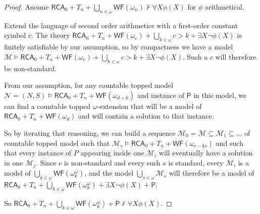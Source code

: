 \documentclass{article}
\numberwithin{theorem}{section}
\newcommand{\RCA}{\mathsf{RCA}}
\newcommand{\WF}{\mathsf{WF}}
\newcommand{\M}{\mathcal{M}}
\begin{document}
\begin{proof}
Assume $\RCA_0 + T_n + \bigcup_{n \in \omega} \WF(\omega_n) \not \vdash \forall X \phi(X)$ for $\phi$ arithmetical.  

Extend the language of second order arithmetics with a first-order constant symbol $c$. The theory $\RCA_0 + T_n + \WF(\omega_c) + \bigcup_{k \in \omega} c > k + \exists X \neg \phi(X)$ is finitely satisfiable by our assumption, so by compactness we have a model $\M \models \RCA_0 + T_n + \WF(\omega_c) + \bigcup_{k \in \omega} c > k + \exists X \neg \phi(X)$. Such a $c$ will therefore be non-standard.

From our assumption, for any countable topped model $\mathcal{N} = (N,S) \models \RCA_0 + T_n + \WF(\omega_{d+k})$ and instance of $\mathsf{P}$ in this model, we can find a countable topped $\omega$-extension that will be a model of $\RCA_0 + T_n + \WF(\omega_{d})$ and will contain a solution to that instance.

So by iterating that reasoning, we can build a sequence  $\M_0 = \M \subseteq \M_1 \subseteq \dots$ of countable topped model such that $\M_s \models \RCA_0 + T_n + \WF(\omega_{c - ks})$ and such that every instance of $P$ appearing inside one $\M_i$ will eventually have a solution in one $\M_j$. Since $c$ is non-standard and every such $s$ is standard, every $\M_i$ is a model of $\bigcup_{k \in \omega} \WF(\omega^\omega_k)$, and the model $\bigcup_{s \in \omega} \M_s$ will therefore be a model of $\RCA_0 + T_n + \bigcup_{k \in \omega} \WF(\omega^\omega_k) + \exists X \neg \phi(X) + \mathsf{P}$.

So $\RCA_0 + T_n + \bigcup_{k \in \omega} \WF(\omega^\omega_k)  + \mathsf{P} \not \vdash \forall X \phi(X)$.
\end{proof}
\end{document}

